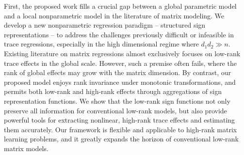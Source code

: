\documentclass[11pt]{article}
\theoremstyle{plain}
\theoremstyle{definition}
\begin{document}
First, the proposed work fills a crucial gap between a global parametric model and a local nonparametric model in the literature of matrix modeling. We develop a new nonparametric regression paradigm -- structured sign representations -- to address the challenges previously difficult or infeasible in trace regressions, especially in the high dimensional regime where $d_1d_2\gg n$. Existing literature on matrix regressions almost exclusively focuses on low-rank trace effects in the global scale. However, such a premise often fails, where the rank of global effects may grow with the matrix dimension. By contrast, our proposed model enjoys rank invariance under monotonic transformations, and permits both low-rank and high-rank effects through aggregations of sign representation functions. We show that the low-rank sign functions not only preserve all information for conventional low-rank models, but also provide powerful tools for extracting nonlinear, high-rank trace effects and estimating them accurately. Our framework is flexible and applicable to high-rank matrix learning problems, and it greatly expands the horizon of conventional low-rank matrix models.
\end{document}

